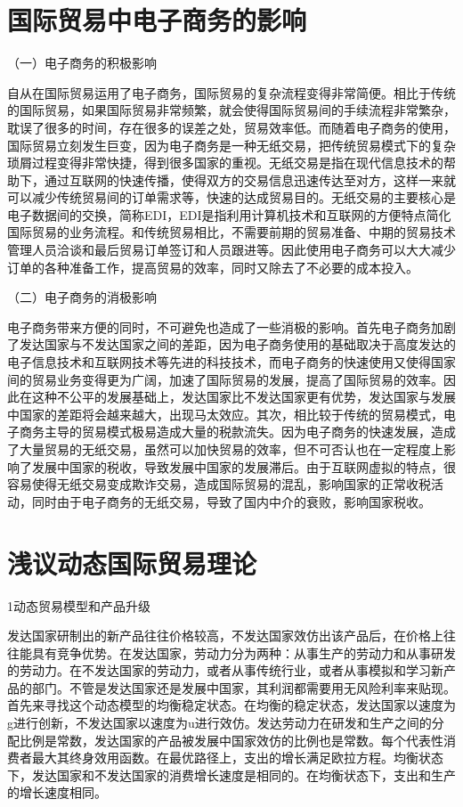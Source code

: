 \section{国际贸易中电子商务的影响}

（一）电子商务的积极影响

自从在国际贸易运用了电子商务，国际贸易的复杂流程变得非常简便。相比于传统的国际贸易，如果国际贸易非常频繁，就会使得国际贸易间的手续流程非常繁杂，耽误了很多的时间，存在很多的误差之处，贸易效率低。而随着电子商务的使用，国际贸易立刻发生巨变，因为电子商务是一种无纸交易，把传统贸易模式下的复杂琐屑过程变得非常快捷，得到很多国家的重视。无纸交易是指在现代信息技术的帮助下，通过互联网的快速传播，使得双方的交易信息迅速传达至对方，这样一来就可以减少传统贸易间的订单需求等，快速的达成贸易目的。无纸交易的主要核心是电子数据间的交换，简称EDI，EDI是指利用计算机技术和互联网的方便特点简化国际贸易的业务流程。和传统贸易相比，不需要前期的贸易准备、中期的贸易技术管理人员洽谈和最后贸易订单签订和人员跟进等。因此使用电子商务可以大大减少订单的各种准备工作，提高贸易的效率，同时又除去了不必要的成本投入。

（二）电子商务的消极影响

电子商务带来方便的同时，不可避免也造成了一些消极的影响。首先电子商务加剧了发达国家与不发达国家之间的差距，因为电子商务使用的基础取决于高度发达的电子信息技术和互联网技术等先进的科技技术，而电子商务的快速使用又使得国家间的贸易业务变得更为广阔，加速了国际贸易的发展，提高了国际贸易的效率。因此在这种不公平的发展基础上，发达国家比不发达国家更有优势，发达国家与发展中国家的差距将会越来越大，出现马太效应。其次，相比较于传统的贸易模式，电子商务主导的贸易模式极易造成大量的税款流失。因为电子商务的快速发展，造成了大量贸易的无纸交易，虽然可以加快贸易的效率，但不可否认也在一定程度上影响了发展中国家的税收，导致发展中国家的发展滞后。由于互联网虚拟的特点，很容易使得无纸交易变成欺诈交易，造成国际贸易的混乱，影响国家的正常收税活动，同时由于电子商务的无纸交易，导致了国内中介的衰败，影响国家税收。 

\section{浅议动态国际贸易理论}
 1动态贸易模型和产品升级

发达国家研制出的新产品往往价格较高，不发达国家效仿出该产品后，在价格上往往能具有竞争优势。在发达国家，劳动力分为两种：从事生产的劳动力和从事研发的劳动力。在不发达国家的劳动力，或者从事传统行业，或者从事模拟和学习新产品的部门。不管是发达国家还是发展中国家，其利润都需要用无风险利率来贴现。首先来寻找这个动态模型的均衡稳定状态。在均衡的稳定状态，发达国家以速度为g进行创新，不发达国家以速度为u进行效仿。发达劳动力在研发和生产之间的分配比例是常数，发达国家的产品被发展中国家效仿的比例也是常数。每个代表性消费者最大其终身效用函数。在最优路径上，支出的增长满足欧拉方程。均衡状态下，发达国家和不发达国家的消费增长速度是相同的。在均衡状态下，支出和生产的增长速度相同。

